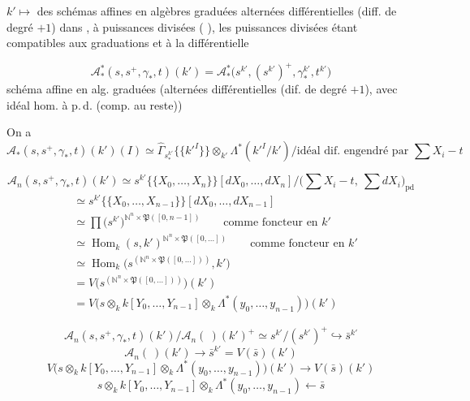 \documentclass[11pt,a4paper]{article}
\begin{document}
$k'\mapsto$ \ill{} des  schémas affines en algèbres graduées
alternées différentielles  (diff. de degré $+1$) dans
\ill{}, à puissances divisées (\ill{} \ill{}), les puissances divisées étant
compatibles aux graduations et à la différentielle

\[
  \mathcal{A}^{*}_{*}(s,s^+,\gamma_*,t)(k')
  =\mathcal{A}^{*}_{*}\bigl(s^{k'},(s^{k'})^+,\gamma_*^{k'},t^{k'}\bigr)
\]
schéma affine en alg. graduées (alternées différentielles (dif. de
degré $+1$), avec idéal hom. à p.\,d. (comp. au reste))

On a
\[
  \mathcal{A}_*(s,s^+,\gamma_*,t)(k')(I)\simeq
  \widehat{\Gamma}_{s^{k'}_*}\{\{k'^{I}\}\}\otimes_{k'}
  \Lambda^{*}(k'^{I}/k')\big/\text{idéal dif. engendré par }\textstyle\sum X_i-t
\]

\[
  \mathcal{A}_n(s,s^+,\gamma_*,t)(k')\simeq
  s^{k'}\{\{X_0,\dots,X_n\}\}[dX_0,\dots,dX_n]\big/
  \bigl(\textstyle\sum X_i-t,\ \sum dX_i\bigr)_{\mathrm{pd}}
\]
\begin{align*}
  &\simeq s^{k'}\{\{X_0,\dots,X_{n-1}\}\}[dX_0,\dots,dX_{n-1}]\\
  &\simeq \prod\bigl(s^{k'}\bigr)^{\mathbb{N}^n\times\mathfrak{P}([0,n-1])}
  \qquad\text{comme foncteur en } k'\\
  &\simeq \operatorname{Hom}_k(s,k')^{\mathbb{N}^n\times\mathfrak{P}([0,\dots])}
  \qquad\text{comme foncteur en } k'\\
  &\simeq \operatorname{Hom}_k\bigl(s^{(\mathbb{N}^n\times\mathfrak{P}([0,\dots]))},k'\bigr)\\
  &= V\bigl(s^{(\mathbb{N}^n\times\mathfrak{P}([0,\dots]))}\bigr)(k')\\
  &= V\bigl(s\otimes_k k[Y_0,\dots,Y_{n-1}]\otimes_k
     {\textstyle\Lambda^{*}}(y_0,\dots,y_{n-1})\bigr)(k')
\end{align*}

\[
  \mathcal{A}_n(s,s^+,\gamma_*,t)(k')\big/\mathcal{A}_n(\ )(k')^+
  \simeq s^{k'}\big/(s^{k'})^+\hookrightarrow \bar s^{k'}
\]
\[
  \mathcal{A}_n(\ )(k')\longrightarrow \bar s^{k'}=V(\bar s)(k')
\]
\[
  V\bigl(s\otimes_k k[Y_0,\dots,Y_{n-1}]\otimes_k{\textstyle\Lambda^{*}}(y_0,\dots,y_{n-1})\bigr)(k')
  \longrightarrow V(\bar s)(k')
\]
\[
  s\otimes_k k[Y_0,\dots,Y_{n-1}]\otimes_k{\textstyle\Lambda^{*}}(y_0,\dots,y_{n-1})
  \longleftarrow \bar s
\]
\end{document}

